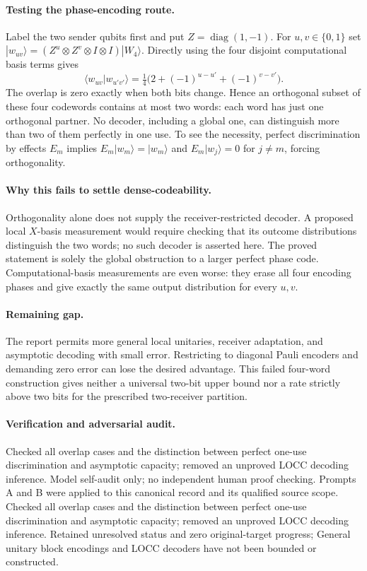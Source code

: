 \documentclass[11pt]{article}
\begin{document}
\paragraph{Testing the phase-encoding route.} Label the two sender qubits first and put $Z=\operatorname{diag}(1,-1)$. For $u,v\in\{0,1\}$ set $|w_{uv}\rangle=(Z^u\otimes Z^v\otimes I\otimes I)|W_4\rangle$. Directly using the four disjoint computational basis terms gives
\[
 \langle w_{uv}|w_{u'v'}\rangle
 =\tfrac14\bigl(2+(-1)^{u-u'}+(-1)^{v-v'}\bigr).
\]
The overlap is zero exactly when both bits change. Hence an orthogonal subset of these four codewords contains at most two words: each word has just one orthogonal partner. No decoder, including a global one, can distinguish more than two of them perfectly in one use. To see the necessity, perfect discrimination by effects $E_m$ implies $E_m|w_m\rangle=|w_m\rangle$ and $E_m|w_j\rangle=0$ for $j\ne m$, forcing orthogonality.

\paragraph{Why this fails to settle dense-codeability.} Orthogonality alone does not supply the receiver-restricted decoder. A proposed local $X$-basis measurement would require checking that its outcome distributions distinguish the two words; no such decoder is asserted here. The proved statement is solely the global obstruction to a larger perfect phase code. Computational-basis measurements are even worse: they erase all four encoding phases and give exactly the same output distribution for every $u,v$.

\paragraph{Remaining gap.} The report permits more general local unitaries, receiver adaptation, and asymptotic decoding with small error. Restricting to diagonal Pauli encoders and demanding zero error can lose the desired advantage. This failed four-word construction gives neither a universal two-bit upper bound nor a rate strictly above two bits for the prescribed two-receiver partition.

\paragraph{Verification and adversarial audit.}
Checked all overlap cases and the distinction between perfect one-use discrimination and asymptotic capacity; removed an unproved LOCC decoding inference. Model self-audit only; no independent human proof checking. Prompts A and B were applied to this canonical record and its qualified source scope. Checked all overlap cases and the distinction between perfect one-use discrimination and asymptotic capacity; removed an unproved LOCC decoding inference. Retained unresolved status and zero original-target progress; General unitary block encodings and LOCC decoders have not been bounded or constructed.
\end{document}
